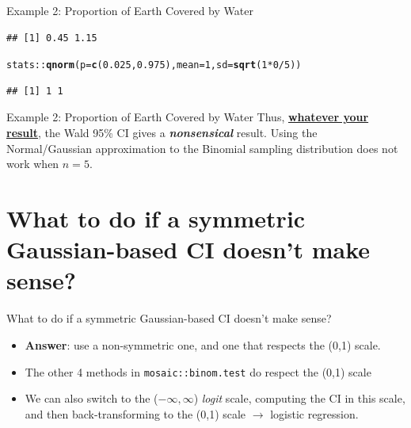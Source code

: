 \documentclass[10pt,handout]{beamer}\usepackage[]{graphicx}\usepackage[]{color}
\makeatletter
\newcommand{\hlnum}[1]{\textcolor[rgb]{0.686,0.059,0.569}{#1}}%
\newcommand{\hlopt}[1]{\textcolor[rgb]{0,0,0}{#1}}%
\newcommand{\hlstd}[1]{\textcolor[rgb]{0.345,0.345,0.345}{#1}}%
\newcommand{\hlkwc}[1]{\textcolor[rgb]{0.333,0.667,0.333}{#1}}%
\newcommand{\hlkwd}[1]{\textcolor[rgb]{0.737,0.353,0.396}{\textbf{#1}}}%
\newenvironment{kframe}{%
 \def\at@end@of@kframe{}%
 \ifinner\ifhmode%
  \def\at@end@of@kframe{\end{minipage}}%
  \begin{minipage}{\columnwidth}%
 \fi\fi%
 \def\FrameCommand##1{\hskip\@totalleftmargin \hskip-\fboxsep
 \colorbox{shadecolor}{##1}\hskip-\fboxsep
     \hskip-\linewidth \hskip-\@totalleftmargin \hskip\columnwidth}%
 \MakeFramed {\advance\hsize-\width
   \@totalleftmargin\z@ \linewidth\hsize
   \@setminipage}}%
 {\par\unskip\endMakeFramed%
 \at@end@of@kframe}
\newenvironment{knitrout}{}{} %
\makeatother
\begin{document}
\begin{frame}[fragile]{Example 2: Proportion of Earth Covered by Water}
\begin{knitrout}
\begin{kframe}
\begin{alltt}
\end{alltt}
\begin{verbatim}
## [1] 0.45 1.15
\end{verbatim}
\begin{alltt}
\hlstd{stats}\hlopt{::}\hlkwd{qnorm}\hlstd{(}\hlkwc{p}\hlstd{=}\hlkwd{c}\hlstd{(}\hlnum{0.025}\hlstd{,}\hlnum{0.975}\hlstd{),} \hlkwc{mean} \hlstd{=} \hlnum{1}\hlstd{,} \hlkwc{sd} \hlstd{=} \hlkwd{sqrt}\hlstd{(}\hlnum{1} \hlopt{*} \hlnum{0} \hlopt{/} \hlnum{5}\hlstd{))}
\end{alltt}
\begin{verbatim}
## [1] 1 1
\end{verbatim}
\end{kframe}
\end{knitrout}
	
	
\end{frame}



\begin{frame}{Example 2: Proportion of Earth Covered by Water}
	Thus, \textbf{\underline{whatever your result}}, the Wald 95\% CI gives a \textit{\textbf{nonsensical}} result. Using the Normal/Gaussian approximation to the Binomial sampling distribution does not work when $n=5.$
\end{frame}


\section{What to do if a symmetric Gaussian-based CI doesn't make sense?}


\begin{frame}{What to do if a symmetric Gaussian-based CI doesn't make sense?}
	\begin{itemize}
		\setlength\itemsep{1em}
		\item \textbf{Answer}: use a non-symmetric one, and one that respects the (0,1) scale. \pause 
		\item The other 4 methods in \texttt{mosaic::binom.test} do respect the (0,1) scale \pause 
		\item We can also switch to the ($-\infty, \infty$)  \textit{logit} scale, computing the CI in this scale, and then back-transforming to the (0,1) scale $\to$ logistic regression.
	\end{itemize}
\end{frame}
\end{document}
